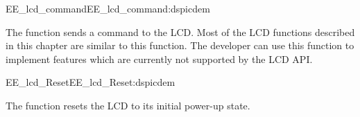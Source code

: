 \begin{function_nopb2}{EE\_lcd\_command}{EE_lcd_command:dspicdem}
  
  \begin{fundescription}
    The function sends a command to the LCD. Most of the LCD functions
    described in this chapter are similar to this function. The
    developer can use this function to implement features which are
    currently not supported by the LCD API.
  \end{fundescription}
  
  \begin{funparameters}
  \end{funparameters}
  
  
\end{function_nopb2}

\begin{function_nopb2}{EE\_lcd\_Reset}{EE_lcd_Reset:dspicdem}
  
  \begin{fundescription}
    The function resets the LCD to its initial power-up state.
  \end{fundescription}
  
  
  
\end{function_nopb2}

